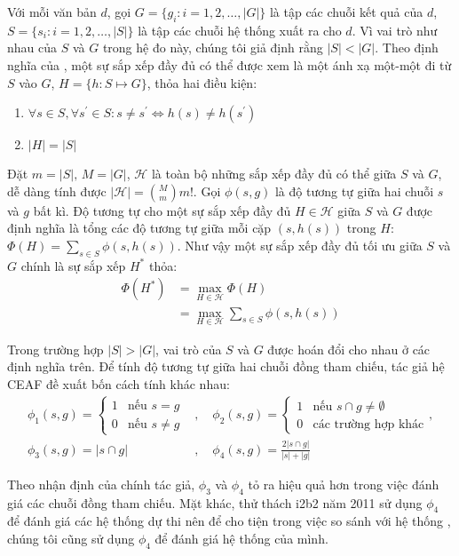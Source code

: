 Với mỗi văn bản $d$, gọi $G=\{g_i:i=1,2,\dots,|G|\}$ là tập các chuỗi kết quả của $d$, $S=\{s_i:i=1,2,\dots,|S|\}$ là tập các chuỗi hệ thống xuất ra cho $d$. Vì vai trò như nhau của $S$ và $G$ trong hệ đo này, chúng tôi giả định rằng $|S|<|G|$. Theo định nghĩa của \cite{XiaoquangLuo2005}, một sự sắp xếp đầy đủ có thể được xem là một ánh xạ một-một đi từ $S$ vào $G$, $H=\{h:S\mapsto G\}$, thỏa hai điều kiện:
\begin{enumerate}
\item $\forall s \in S,\forall s^{\prime} \in S: s\neq s^{\prime} \Leftrightarrow h(s)\neq h(s^{\prime})$
\item $|H|=|S|$
\end{enumerate}

Đặt $m=|S|,\, M=|G|$, $\mathcal{H}$ là toàn bộ những sắp xếp đầy đủ có thể giữa $S$ và $G$, dễ dàng tính được $|\mathcal{H}|=\binom{M}{m}m!$. Gọi $\phi(s,g)$ là độ tương tự giữa hai chuỗi $s$ và $g$ bất kì. Độ tương tự cho một sự sắp xếp đầy đủ $H\in\mathcal{H}$ giữa $S$ và $G$ được định nghĩa là tổng các độ tương tự giữa mỗi cặp $(s,h(s))$ trong $H$: $\Phi(H)=\sum_{s\in S} \phi(s,h(s))$. Như vậy một sự sắp xếp đầy đủ tối ưu giữa $S$ và $G$ chính là sự sắp xếp $H^*$ thỏa:
\begin{align*}
\Phi(H^*)&=\max_{H\in\mathcal{H}} \Phi(H)\\
&=\max_{H\in\mathcal{H}} \sum_{s\in S} \phi(s,h(s))
\end{align*}

Trong trường hợp $|S|>|G|$, vai trò của $S$ và $G$ được hoán đổi cho nhau ở các định nghĩa trên. Để tính độ tương tự giữa hai chuỗi đồng tham chiếu, tác giả hệ CEAF đề xuất bốn cách tính khác nhau:
\begin{align*}
\phi_1(s,g)=
\begin{cases}
	1 & \text{nếu } s = g\\
	0 & \text{nếu } s \neq g
\end{cases}&,\quad
\phi_2(s,g)=
\begin{cases}
	1 & \text{nếu } s\cap g\neq\emptyset\\
	0 & \text{các trường hợp khác}
\end{cases},\\
\phi_3(s,g)=|s\cap g|&,\quad\phi_4(s,g)=\frac{2|s\cap g|}{|s|+|g|}
\end{align*}

Theo nhận định của chính tác giả, $\phi_3$ và $\phi_4$ tỏ ra hiệu quả hơn trong việc đánh giá các chuỗi đồng tham chiếu. Mặt khác, thử thách i2b2 năm 2011 sử dụng $\phi_4$ để đánh giá các hệ thống dự thi nên để cho tiện trong việc so sánh với hệ thống \cite{YanXu2012}, chúng tôi cũng sử dụng $\phi_4$ để đánh giá hệ thống của mình.

